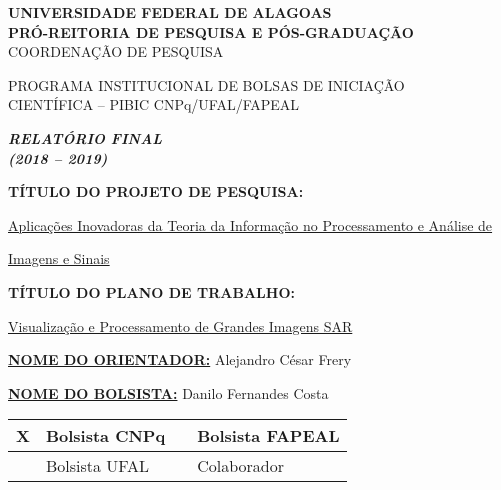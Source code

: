 \documentclass[12pt,letterpaper]{article}
\begin{document}
\onehalfspacing 
\thispagestyle{empty}

\begin{center}
\vspace{0.2cm}

\hrulefill

\textbf{UNIVERSIDADE FEDERAL DE ALAGOAS}\\
\textbf{PRÓ-REITORIA DE PESQUISA E PÓS-GRADUAÇÃO}\\
COORDENAÇÃO DE PESQUISA

\hrulefill

\vspace{0.5cm}

PROGRAMA INSTITUCIONAL DE BOLSAS DE INICIAÇÃO\\ CIENTÍFICA -- PIBIC CNPq/UFAL/FAPEAL

\vspace{1.0cm}

\textbf{\textit{\Large{RELATÓRIO FINAL \\ (2018 -- 2019)}}}\\

\vspace{1.2cm}

\textbf{TÍTULO DO PROJETO DE PESQUISA:}

\underline{Aplicações Inovadoras da Teoria da Informação no Processamento e Análise de}

\underline{Imagens e Sinais}

\vspace{0.6cm}

\textbf{TÍTULO DO PLANO DE TRABALHO:}

\underline{Visualização e Processamento de Grandes Imagens SAR}

\end{center}

\textbf{\underline{NOME DO ORIENTADOR:}} Alejandro César Frery 

\vspace{0.4cm}

\textbf{\underline{NOME DO BOLSISTA:}} Danilo Fernandes Costa

\vspace{1cm}

\begin{table}[!h]
\begin{center}
\begin{tabularx}{\textwidth}{|X|X|X|X|}
\hline                              
\hspace{1.3cm} X & Bolsista CNPq &  &Bolsista FAPEAL\\
\hline             
& Bolsista UFAL &  &Colaborador\\
\hline     
\end{tabularx}
\end{center}
\end{table}
\end{document}
